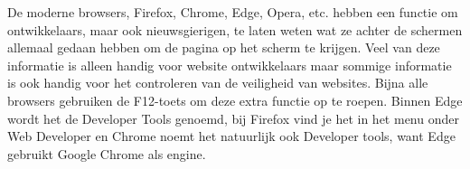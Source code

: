 De moderne browsers, Firefox, Chrome, Edge, Opera, etc. hebben een functie om ontwikkelaars, maar ook nieuwsgierigen, te laten weten wat ze achter de schermen allemaal gedaan hebben om de pagina op het scherm te krijgen. Veel van deze informatie is alleen handig voor website ontwikkelaars maar sommige informatie is ook handig voor het controleren van de veiligheid van websites. Bijna alle browsers gebruiken de F12-toets om deze extra functie op te roepen. Binnen Edge wordt het de Developer Tools genoemd, bij Firefox vind je het in het menu onder Web Developer en Chrome noemt het natuurlijk ook Developer tools, want Edge gebruikt Google Chrome als engine.
